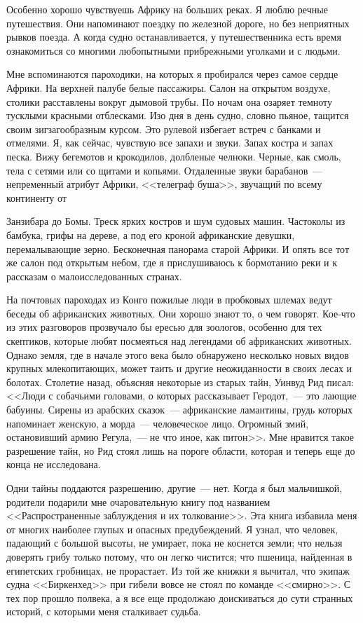 \documentclass[12pt,a4paper,twoside,openany,svgnames]{memoir}
\begin{document}
Особенно хорошо чувствуешь Африку на больших реках. Я люблю речные путешествия. Они напоминают поездку по железной дороге, но без неприятных рывков поезда. А когда судно останавливается, у путешественника есть время ознакомиться со многими любопытными прибрежными уголками и с людьми.

Мне вспоминаются пароходики, на которых я пробирался через самое сердце Африки. На верхней палубе белые пассажиры. Салон на открытом воздухе, столики расставлены вокруг дымовой трубы. По ночам она озаряет темноту тусклыми красными отблесками. Изо дня в день судно, словно пьяное, тащится своим зигзагообразным курсом. Это рулевой избегает встреч с банками и отмелями. Я, как сейчас, чувствую все запахи и звуки. Запах костра и запах песка. Вижу бегемотов и крокодилов, долбленые челноки. Черные, как смоль, тела с сетями или со щитами и копьями. Отдаленные звуки барабанов~--- непременный атрибут Африки, <<телеграф буша>>, звучащий по всему континенту от

Занзибара до Бомы. Треск ярких костров и шум судовых машин. Частоколы из бамбука, грифы на дереве, а под его кроной африканские девушки, перемалывающие зерно. Бесконечная панорама старой Африки. И опять все тот же салон под открытым небом, где я прислушиваюсь к бормотанию реки и к рассказам о малоисследованных странах.

На почтовых пароходах из Конго пожилые люди в пробковых шлемах ведут беседы об африканских животных. Они хорошо знают то, о чем говорят. Кое-что из этих разговоров прозвучало бы ересью для зоологов, особенно для тех скептиков, которые любят посмеяться над легендами об африканских животных. Однако земля, где в начале этого века было обнаружено несколько новых видов крупных млекопитающих, может таить и другие неожиданности в своих лесах и болотах. Столетие назад, объясняя некоторые из старых тайн, Уинвуд Рид писал: <<Люди с собачьими головами, о которых рассказывает Геродот,~--- это лающие бабуины. Сирены из арабских сказок~--- африканские ламантины, грудь которых напоминает женскую, а морда~--- человеческое лицо. Огромный змий, остановивший армию Регула,~--- не что иное, как питон>>. Мне нравится такое разрешение тайн, но Рид стоял лишь на пороге области, которая и теперь еще до конца не исследована.

Одни тайны поддаются разрешению, другие~--- нет. Когда я был мальчишкой, родители подарили мне очаровательную книгу под названием <<Распространенные заблуждения и их толкование>>. Эта книга избавила меня от многих наиболее глупых и опасных предубеждений. Я узнал, что человек, падающий с большой высоты, не умирает, пока не коснется земли; что нельзя доверять грибу только потому, что он легко чистится; что пшеница, найденная в египетских гробницах, не прорастает. Из той же книжки я вычитал, что экипаж судна <<Биркенхед>> при гибели вовсе не стоял по команде <<смирно>>. С тех пор прошло полвека, а я все еще продолжаю доискиваться до сути странных историй, с которыми меня сталкивает судьба.
\end{document}
